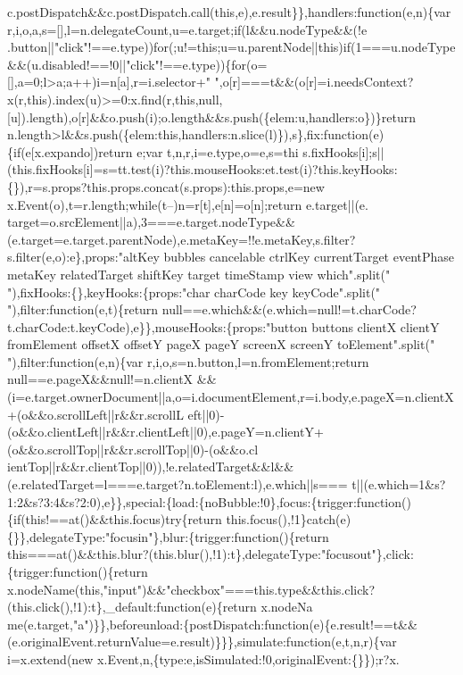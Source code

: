 \begin{DoxyCode}
{       c.postDispatch&&c.postDispatch.call(this,e),e.result\}\},handlers:function(e,n)\{var
       r,i,o,a,s=[],l=n.delegateCount,u=e.target;if(l&&u.nodeType&&(!e
      .button||"click"!==e.type))for(;u!=this;u=u.parentNode||this)if(1===u.nodeType&&(u.disabled!==!0||"click"!==e.type))\{for(o=[],a=0;l>a;a++)i=n[a],r=i.selector+"
       ",o[r]===t&&(o[r]=i.needsContext?x(r,this).index(u)>=0:x.find(r,this,null,[u]).length),o[r]&&o.push(i);o.length&&s.push(\{elem:u,handlers:o\})\}return
       n.length>l&&s.push(\{elem:this,handlers:n.slice(l)\}),s\},fix:function(e)\{if(e[x.expando])return e;var
       t,n,r,i=e.type,o=e,s=thi
      s.fixHooks[i];s||(this.fixHooks[i]=s=tt.test(i)?this.mouseHooks:et.test(i)?this.keyHooks:\{\}),r=s.props?this.props.concat(s.props):this.props,e=new x.Event(o),t=r.length;while(t--)n=r[t],e[n]=o[n];return
       e.target||(e.
      target=o.srcElement||a),3===e.target.nodeType&&(e.target=e.target.parentNode),e.metaKey=!!e.metaKey,s.filter?s.filter(e,o):e\},props:"altKey bubbles cancelable ctrlKey currentTarget eventPhase metaKey relatedTarget
       shiftKey target timeStamp view which".split(" "),fixHooks:\{\},keyHooks:\{props:"char charCode key
       keyCode".split(" "),filter:function(e,t)\{return
       null==e.which&&(e.which=null!=t.charCode?t.charCode:t.keyCode),e\}\},mouseHooks:\{props:"button buttons clientX clientY fromElement offsetX offsetY pageX pageY screenX screenY
       toElement".split(" "),filter:function(e,n)\{var r,i,o,s=n.button,l=n.fromElement;return
       null==e.pageX&&null!=n.clientX
      &&(i=e.target.ownerDocument||a,o=i.documentElement,r=i.body,e.pageX=n.clientX+(o&&o.scrollLeft||r&&r.scrollL
      eft||0)-(o&&o.clientLeft||r&&r.clientLeft||0),e.pageY=n.clientY+(o&&o.scrollTop||r&&r.scrollTop||0)-(o&&o.cl
      ientTop||r&&r.clientTop||0)),!e.relatedTarget&&l&&(e.relatedTarget=l===e.target?n.toElement:l),e.which||s===
      t||(e.which=1&s?1:2&s?3:4&s?2:0),e\}\},special:\{load:\{noBubble:!0\},focus:\{trigger:function()\{if(this!==at()&&this.focus)try\{return this.focus(),!1\}catch(e)\{\}\},delegateType:"focusin"\},blur:\{trigger:function()\{return
       this===at()&&this.blur?(this.blur(),!1):t\},delegateType:"focusout"\},click:\{trigger:function()\{return
       x.nodeName(this,"input")&&"checkbox"===this.type&&this.click?(this.click(),!1):t\},\_default:function(e)\{return
       x.nodeNa
      me(e.target,"a")\}\},beforeunload:\{postDispatch:function(e)\{e.result!==t&&(e.originalEvent.returnValue=e.result)\}\}\},simulate:function(e,t,n,r)\{var i=x.extend(new
       x.Event,n,\{type:e,isSimulated:!0,originalEvent:\{\}\});r?x.
}
\end{DoxyCode}
